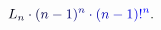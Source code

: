 \documentclass[12pt]{article}
\begin{document}
\makeatletter
\renewcommand*{\@textcolor}[3]{%
  \protect\leavevmode
  \begingroup
    \color#1{#2}#3%
  \endgroup
}
\makeatother
\begin{displaymath}
\mathcolor[RGB]{0,0,15}{L} _ { \mathcolor[RGB]{0,0,30}{n} } \mathcolor[RGB]{0,0,45}{\cdot} \mathcolor[RGB]{0,0,60}{(} \mathcolor[RGB]{0,0,75}{n} \mathcolor[RGB]{0,0,90}{-} \mathcolor[RGB]{0,0,105}{1} \mathcolor[RGB]{0,0,120}{)} ^ { \mathcolor[RGB]{0,0,135}{n} } \mathcolor[RGB]{0,0,150}{\cdot} \mathcolor[RGB]{0,0,165}{(} \mathcolor[RGB]{0,0,180}{n} \mathcolor[RGB]{0,0,195}{-} \mathcolor[RGB]{0,0,210}{1} \mathcolor[RGB]{0,0,225}{)} \mathcolor[RGB]{0,0,240}{!} ^ { \mathcolor[RGB]{0,0,255}{n} } \mathcolor[RGB]{0,15,0}{.}
\end{displaymath}
\end{document}

